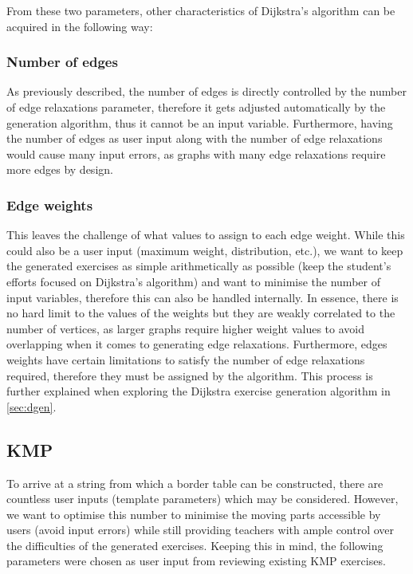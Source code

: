 \documentclass{l4proj}
\begin{document}
From these two parameters, other characteristics of Dijkstra's algorithm can be acquired in the following way:

\subsubsection{Number of edges}
\label{sec:noe}

As previously described, the number of edges is directly controlled by the number of edge relaxations parameter, therefore it gets adjusted automatically by the generation algorithm, thus it cannot be an input variable. Furthermore, having the number of edges as user input along with the number of edge relaxations would cause many input errors, as graphs with many edge relaxations require more edges by design. 

\subsubsection{Edge weights}

This leaves the challenge of what values to assign to each edge weight. While this could also be a user input (maximum weight, distribution, etc.), we want to keep the generated exercises as simple arithmetically as possible (keep the student's efforts focused on Dijkstra's algorithm) and want to minimise the number of input variables, therefore this can also be handled internally. In essence, there is no hard limit to the values of the weights but they are weakly correlated to the number of vertices, as larger graphs require higher weight values to avoid overlapping when it comes to generating edge relaxations. Furthermore, edges weights have certain limitations to satisfy the number of edge relaxations required, therefore they must be assigned by the algorithm. This process is further explained when exploring the Dijkstra exercise generation algorithm in \autoref{sec:dgen}. 

\subsection{KMP}

To arrive at a string from which a border table can be constructed, there are countless user inputs (template parameters) which may be considered. However, we want to optimise this number to minimise the moving parts accessible by users (avoid input errors) while still providing teachers with ample control over the difficulties of the generated exercises. Keeping this in mind, the following parameters were chosen as user input from reviewing existing KMP exercises.
\end{document}

